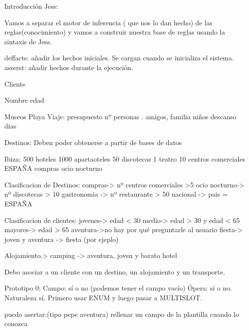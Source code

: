 \documentclass[11pt, a4paper, spanish, openright, twoside]{book}
\begin{document}
	\begin{section}{Introducción}
		Jess:


			Vamos a separar el motor de inferencia ( que nos lo dan hecho) de las reglas(conocimiento) y vamos a construir 					nuestra base de reglas usando la sintaxis de Jess.

			deffacts: añadir los hechos iniciales. Se cargan cuando se inicializa el sistema.
			asserst: añadir hechos durante la ejecución.
			
			
				
					Cliente
				
			Nombre
			edad
			
			Museos
			Playa
			Viaje:
			presupuesto
			nº personas . amigos, familia niños
			descanso
			dias
			
			
				Destinos: Deben poder obtenerse a partir de bases de datos
				
			Ibiza:
				500 hoteles
				1000 apartaoteles
				50 discotecas
				1 teatro
				10 centros comerciales
				ESPAÑA
				compras
				ocio nocturno
				
				
				Clasificacion de Destinos:
					compras-> nº centros comerciales >5
					ocio nocturno-> nº discotecas > 10
					gastronomia -> nº restaurante > 50
					nacional -> pais = ESPAÑA
				
				Clasificacion de clientes:
					jovenes-> edad < 30
					medio-> edad > 30 y edad < 65
					mayores-> edad > 65
					aventura->no hay por qué preguntarle al usuario
					fiesta-> joven y aventura -> fiesta (por ejeplo)
					
				Alojamiento.>
					camping -> aventura, joven y barato
					hotel
					
				
					
		Debo asociar a un cliente con un destino, un alojamiento y un transporte.
		
			
				Prototipo 0:
					Campo: sí o no (podemos tener el campo vacío)
					Ópera: sí o no.
					Naturaleza sí.
					Primero usar ENUM y luego pasar a MULTISLOT.
		
		puedo asertar:(tipo pepe aventura) 
		rellenar un campo de la plantilla cuando lo conozca
				
	\end{section}
\end{document}
